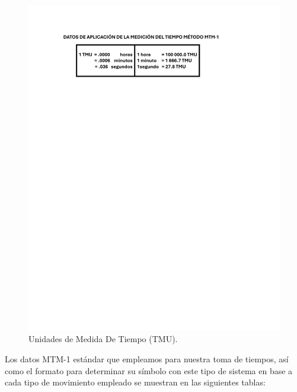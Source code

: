     \begin{figure}[H]
        \centering
        \includegraphics[scale=0.6]{15/img/tablaTMU.pdf}
        \caption{Unidades de Medida De Tiempo (TMU).}
        \label{fig:tablaTMU}
    \end{figure}
    
    Los datos MTM-1 estándar que empleamos para nuestra toma de tiempos, así como el formato para determinar su símbolo con este tipo de sistema en base a cada tipo de movimiento empleado se muestran en las siguientes tablas:
    
